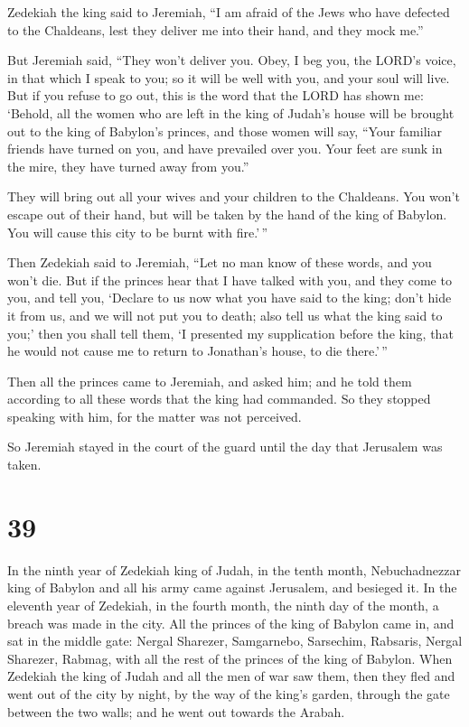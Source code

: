  Zedekiah the king said to Jeremiah, ``I am afraid of the
Jews who have defected to the Chaldeans, lest they deliver me into their
hand, and they mock me.''

 But Jeremiah said, ``They won't deliver you. Obey, I beg
you, the LORD's voice, in that which I speak to you; so it will be well
with you, and your soul will live.  But if you refuse to go
out, this is the word that the LORD has shown me:  `Behold,
all the women who are left in the king of Judah's house will be brought
out to the king of Babylon's princes, and those women will say, ``Your
familiar friends have turned on you, and have prevailed over you. Your
feet are sunk in the mire, they have turned away from you.''

 They will bring out all your wives and your children to
the Chaldeans. You won't escape out of their hand, but will be taken by
the hand of the king of Babylon. You will cause this city to be burnt
with fire.'\,''

 Then Zedekiah said to Jeremiah, ``Let no man know of these
words, and you won't die.  But if the princes hear that I
have talked with you, and they come to you, and tell you, `Declare to us
now what you have said to the king; don't hide it from us, and we will
not put you to death; also tell us what the king said to you;'
 then you shall tell them, `I presented my supplication
before the king, that he would not cause me to return to Jonathan's
house, to die there.'\,''

 Then all the princes came to Jeremiah, and asked him; and
he told them according to all these words that the king had commanded.
So they stopped speaking with him, for the matter was not perceived.

 So Jeremiah stayed in the court of the guard until the day
that Jerusalem was taken.

\hypertarget{section-38}{%
\section{39}\label{section-38}}

 In the ninth year of Zedekiah king of Judah, in the tenth
month, Nebuchadnezzar king of Babylon and all his army came against
Jerusalem, and besieged it.  In the eleventh year of
Zedekiah, in the fourth month, the ninth day of the month, a breach was
made in the city.  All the princes of the king of Babylon
came in, and sat in the middle gate: Nergal Sharezer, Samgarnebo,
Sarsechim, Rabsaris, Nergal Sharezer, Rabmag, with all the rest of the
princes of the king of Babylon.  When Zedekiah the king of
Judah and all the men of war saw them, then they fled and went out of
the city by night, by the way of the king's garden, through the gate
between the two walls; and he went out towards the Arabah.

